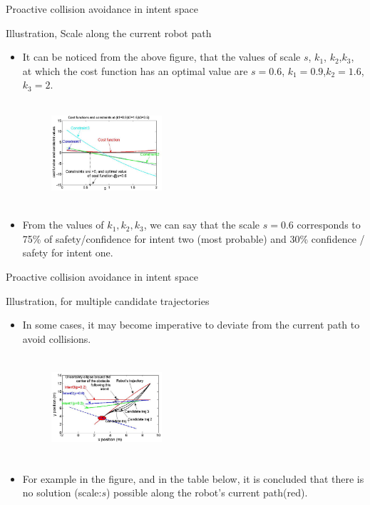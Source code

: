 \documentclass{beamer}
\begin{document}
\begin{frame}{Proactive collision avoidance in intent space}
\begin{block}{Illustration, Scale along the current robot path}
\begin{itemize}
\item{It can be noticed from the above figure, that the values of scale $s$, $k_1$, $k_2$,$k_3$, at which the cost function has an optimal value are $s=0.6$, $k_1=0.9$,$k_2=1.6$,$k_3=2$.}
\begin{figure}
\includegraphics[width= 4.1cm, height=3.8cm]{fig12.eps}
\end{figure}
\item{From the values of $k_1,k_2,k_3$, we can say that the scale $s =0.6$ corresponds to 75\% of safety/confidence for intent two (most probable) and 30\% confidence / safety for intent one.}
\end{itemize}

\end{block}
\end{frame}
\begin{frame}{Proactive collision avoidance in intent space}
\begin{block}{Illustration, for multiple candidate trajectories}
\begin{itemize}
\item{In some cases, it may become imperative to deviate from the current path to avoid collisions.}
\begin{figure}
\includegraphics[width= 4.1cm, height=3.8cm]{fig13.eps}
\end{figure}
\item{For example in the figure, and in the table below, it is concluded that there is no solution (scale:$s$) possible along the robot’s current path(red).}
\end{itemize}
\end{block}
\end{frame}
\end{document}
